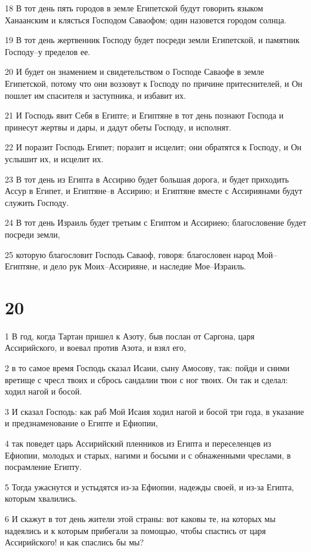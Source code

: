 \par 18 В тот день пять городов в земле Египетской будут говорить языком Ханаанским и клясться Господом Саваофом; один назовется городом солнца.
\par 19 В тот день жертвенник Господу будет посреди земли Египетской, и памятник Господу--у пределов ее.
\par 20 И будет он знамением и свидетельством о Господе Саваофе в земле Египетской, потому что они воззовут к Господу по причине притеснителей, и Он пошлет им спасителя и заступника, и избавит их.
\par 21 И Господь явит Себя в Египте; и Египтяне в тот день познают Господа и принесут жертвы и дары, и дадут обеты Господу, и исполнят.
\par 22 И поразит Господь Египет; поразит и исцелит; они обратятся к Господу, и Он услышит их, и исцелит их.
\par 23 В тот день из Египта в Ассирию будет большая дорога, и будет приходить Ассур в Египет, и Египтяне--в Ассирию; и Египтяне вместе с Ассириянами будут служить Господу.
\par 24 В тот день Израиль будет третьим с Египтом и Ассириею; благословение будет посреди земли,
\par 25 которую благословит Господь Саваоф, говоря: благословен народ Мой--Египтяне, и дело рук Моих--Ассирияне, и наследие Мое--Израиль.

\chapter{20}

\par 1 В год, когда Тартан пришел к Азоту, быв послан от Саргона, царя Ассирийского, и воевал против Азота, и взял его,
\par 2 в то самое время Господь сказал Исаии, сыну Амосову, так: пойди и сними вретище с чресл твоих и сбрось сандалии твои с ног твоих. Он так и сделал: ходил нагой и босой.
\par 3 И сказал Господь: как раб Мой Исаия ходил нагой и босой три года, в указание и предзнаменование о Египте и Ефиопии,
\par 4 так поведет царь Ассирийский пленников из Египта и переселенцев из Ефиопии, молодых и старых, нагими и босыми и с обнаженными чреслами, в посрамление Египту.
\par 5 Тогда ужаснутся и устыдятся из-за Ефиопии, надежды своей, и из-за Египта, которым хвалились.
\par 6 И скажут в тот день жители этой страны: вот каковы те, на которых мы надеялись и к которым прибегали за помощью, чтобы спастись от царя Ассирийского! и как спаслись бы мы?

